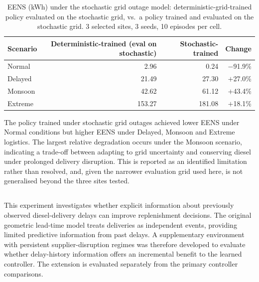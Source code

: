 \begin{table}[htb]
\centering
\caption{EENS (kWh) under the stochastic grid outage model:
deterministic-grid-trained policy evaluated on the stochastic grid,
vs.\ a policy trained and evaluated on the stochastic grid. 3 selected sites, 3 seeds, 10 episodes per cell.}
\label{tab:stochastic_grid}
\begin{tabular}{lrrr}
\toprule
Scenario & Deterministic-trained (eval on stochastic) & Stochastic-trained & Change \\
\midrule
Normal & 2.96 & 0.24 & $-$91.9\% \\
Delayed & 21.49 & 27.30 & $+$27.0\% \\
Monsoon & 42.62 & 61.12 & $+$43.4\% \\
Extreme & 153.27 & 181.08 & $+$18.1\% \\
\bottomrule
\end{tabular}
\end{table}

The policy trained under stochastic grid outages achieved lower EENS
under Normal conditions but higher EENS under Delayed, Monsoon and
Extreme logistics. The largest relative degradation
occurs under the Monsoon scenario, indicating a trade-off between
adapting to grid uncertainty and conserving diesel under prolonged
delivery disruption. This is reported as an identified limitation
rather than resolved, and, given the narrower evaluation grid used
here, is not generalised beyond the three sites tested.

\subsection{}
\label{sec:rlinv_da}

This experiment investigates whether
explicit information about previously observed
diesel-delivery delays can improve replenishment
decisions. The original geometric lead-time
model treats deliveries as independent events,
providing limited predictive information from
past delays. A supplementary environment with
persistent supplier-disruption regimes was
therefore developed to evaluate whether
delay-history information offers an incremental
benefit to the learned controller. The extension is evaluated separately from the
primary controller comparisons.

